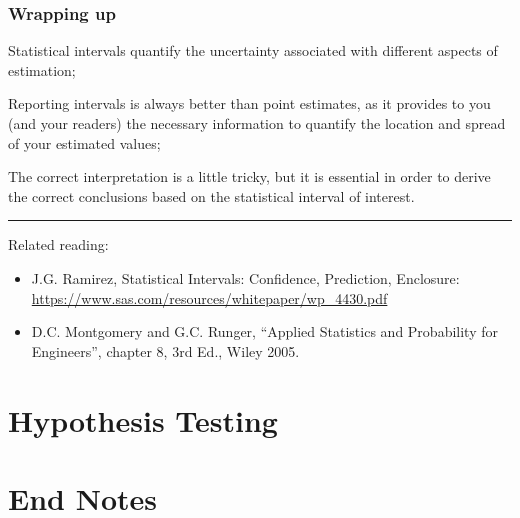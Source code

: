 \documentclass[10pt]{beamer}
\begin{document}
\begin{frame}
  \frametitle{Wrapping up} 
  Statistical intervals quantify the uncertainty associated with
  different aspects of estimation;

  \bigskip

  Reporting intervals is always better than point estimates, as it
  provides to you (and your readers) the necessary information to
  quantify the location and spread of your estimated values;

  \bigskip

  The correct interpretation is a little tricky, but it is essential
  in order to derive the correct conclusions based on the statistical
  interval of interest.

  \bigskip

  \rule{\textwidth}{0.4pt}
  {\smaller
    Related reading:
    \begin{itemize}
      \item J.G. Ramirez, Statistical Intervals: Confidence, Prediction, Enclosure:\\
        \url{https://www.sas.com/resources/whitepaper/wp_4430.pdf}
      \item D.C. Montgomery and G.C. Runger, ``Applied Statistics and
        Probability for Engineers'', chapter 8, 3rd Ed., Wiley 2005.
    \end{itemize}    
  }

\end{frame}

\section{Hypothesis Testing}

\section{End Notes}
\end{document}
